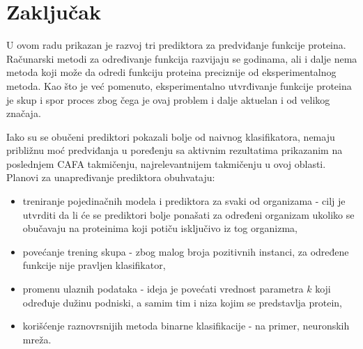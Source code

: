 \chapter{Zaključak} %
\label{Chapter7}

U ovom radu prikazan je razvoj tri prediktora za predviđanje funkcije proteina. Računarski metodi za određivanje funkcija razvijaju se godinama, ali i dalje nema metoda koji može da odredi funkciju proteina preciznije od eksperimentalnog metoda. Kao što je već pomenuto, eksperimentalno utvrđivanje funkcije proteina je skup i spor proces zbog čega je ovaj problem i dalje aktuelan i od velikog značaja. 


Iako su se obučeni prediktori pokazali bolje od naivnog klasifikatora, nemaju približnu moć predviđanja u poređenju sa aktivnim rezultatima prikazanim na poslednjem CAFA takmičenju, najrelevantnijem takmičenju u ovoj oblasti. Planovi za unapređivanje prediktora obuhvataju:

\begin{itemize}
	\item treniranje pojedinačnih modela i prediktora za svaki od organizama - cilj je utvrditi da li će se prediktori bolje ponašati za određeni organizam ukoliko se obučavaju na proteinima koji potiču isključivo iz tog organizma,
	
	\item povećanje trening skupa - zbog malog broja pozitivnih instanci, za određene funkcije nije pravljen klasifikator,
	
	\item promenu ulaznih podataka - ideja je povećati vrednost parametra $k$ koji određuje dužinu podniski, a samim tim i niza kojim se predstavlja protein,
	
	\item korišćenje raznovrsnijih metoda binarne klasifikacije - na primer, neuronskih mreža.
\end{itemize}

